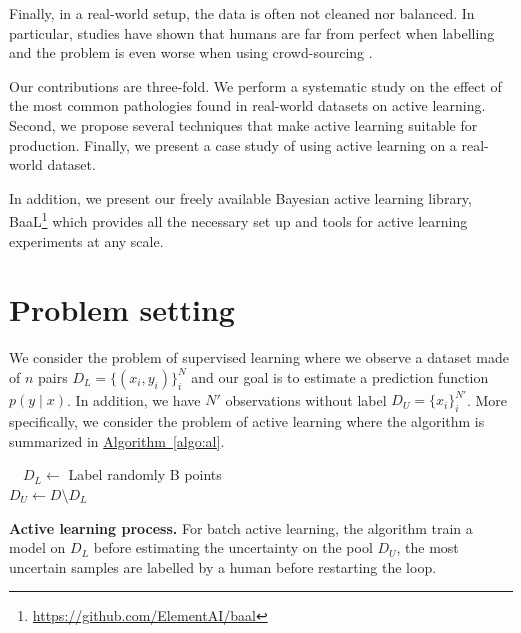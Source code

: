 \documentclass{article}
\newcommand{\algoref}[1]{\hyperref[#1]{Algorithm\ \ref*{#1}}}
\begin{document}
Finally, in a real-world setup, the data is often not cleaned nor balanced. In particular, studies have shown that humans are far from perfect when labelling and the problem is even worse when using crowd-sourcing \citep{ipeirotis2010quality, allahbakhsh2013quality}.

Our contributions are three-fold. We perform a systematic study on the effect of the most common pathologies found in real-world datasets on active learning. Second, we propose several techniques that make active learning suitable for production. Finally, we present a case study of using active learning on a real-world dataset. 

In addition, we present our freely available Bayesian active learning library, BaaL\footnote{\url{https://github.com/ElementAI/baal}} which provides all the necessary set up and tools for active learning experiments at any scale.

\section{Problem setting}

We consider the problem of supervised learning where we observe a dataset made of $n$ pairs $D_L= \{(x_i, y_i)\}_i^{N}$ and our goal is to estimate a prediction function $p(y\mid x)$. In addition, we have $N'$ observations without label $D_U = \{x_i\}_i^{N'}$. More specifically, we consider the problem of active learning where the algorithm is summarized in \algoref{algo:al}.

\begin{algorithm}
 ~~$D_L \leftarrow$ Label randomly B points\;\\
 $D_U \leftarrow D \setminus D_L$ \;\\
 \caption{\textbf{Active learning process.} For batch active learning, the algorithm train a model on $D_L$ before estimating the uncertainty on the pool $D_U$, the most uncertain samples are labelled by a human before restarting the loop.}
 \label{algo:al}
\end{algorithm}

\end{document}

